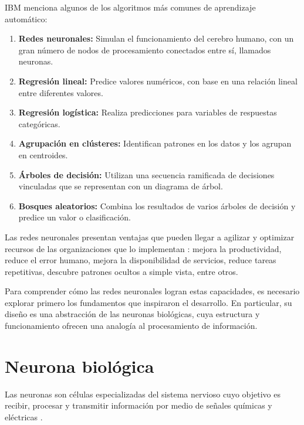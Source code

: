 IBM \cite{IBM2025} menciona algunos de los algoritmos más comunes de aprendizaje automático:

\begin{enumerate}
	
	\item \textbf{Redes neuronales:} Simulan el funcionamiento del cerebro humano, con un gran número de nodos de procesamiento conectados entre sí, llamados neuronas.
	
	\item \textbf{Regresión lineal:} Predice valores numéricos, con base en una relación lineal entre diferentes valores.
	
	\item \textbf{Regresión logística:} Realiza predicciones para variables de respuestas categóricas.
	
	\item \textbf{Agrupación en clústeres:} Identifican patrones en los datos y los agrupan en centroides.
	
	\item \textbf{Árboles de decisión:} Utilizan una secuencia ramificada de decisiones vinculadas que se representan con un diagrama de árbol.
	
	\item \textbf{Bosques aleatorios:} Combina los resultados de varios árboles de decisión y predice un valor o clasificación.
	
\end{enumerate}

Las redes neuronales presentan ventajas que pueden llegar a agilizar y optimizar recursos de las organizaciones que lo implementan \cite{Adobe2025}: mejora la productividad, reduce el error humano, mejora la disponibilidad de servicios, reduce tareas repetitivas, descubre patrones ocultos a simple vista, entre otros.

Para comprender cómo las redes neuronales logran estas capacidades, es necesario explorar primero los fundamentos que inspiraron el desarrollo. En particular, su diseño es una abstracción de las neuronas biológicas, cuya estructura y funcionamiento ofrecen una analogía al procesamiento de información.

\section{Neurona biológica}

Las neuronas son células especializadas del sistema nervioso cuyo objetivo es recibir, procesar y transmitir información por medio de señales químicas y eléctricas \cite{neurona_1, neurona_2}. 

